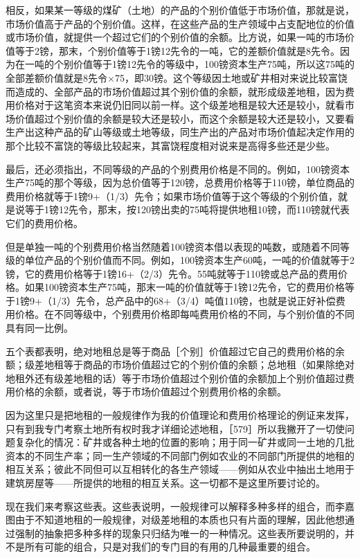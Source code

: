 相反，如果某一等级的煤矿（土地）的产品的个别价值低于市场价值，那就是说，市场价值高于产品的个别价值。这样，在这些产品的生产领域中占支配地位的价值或市场价值，就提供一个超过它们的个别价值的余额。比方说，如果一吨的市场价值等于2镑，那末，个别价值等于1镑12先令的一吨，它的差额价值就是8先令。因为在一吨的个别价值等于1镑12先令的等级中，100镑资本生产75吨，所以这75吨的全部差额价值就是8先令×75，即30镑。这个等级因土地或矿井相对来说比较富饶而造成的、全部产品的市场价值超过其个别价值的余额，就形成级差地租，因为费用价格对于这笔资本来说仍旧同以前一样。这个级差地租是较大还是较小，就看市场价值超过个别价值的余额是较大还是较小，而这个余额是较大还是较小，又要看生产出这种产品的矿山等级或土地等级，同生产出的产品对市场价值起决定作用的那个比较不富饶的等级比较起来，其富饶程度相对说来是高得多些还是少些。

最后，还必须指出，不同等级的产品的个别费用价格是不同的。例如，100镑资本生产75吨的那个等级，因为总价值等于120镑，总费用价格等于110镑，单位商品的费用价格就等于1镑9+（1/3）先令；如果市场价值等于这个等级的个别价值，就是说等于1镑12先令，那末，按120镑出卖的75吨将提供地租10镑，而110镑就代表它们的费用价格。

但是单独一吨的个别费用价格当然随着100镑资本借以表现的吨数，或随着不同等级的单位产品的个别价值而不同。例如，100镑资本生产60吨，一吨的价值就等于2镑，它的费用价格等于1镑16+（2/3）先令。55吨就等于110镑或总产品的费用价格。如果100镑资本生产75吨，那末一吨的价值就等于1镑12先令，它的费用价格等于1镑9+（1/3）先令，总产品中的68+（3/4）吨值110镑，也就是说正好补偿费用价格。在不同等级中，个别费用价格即每吨费用价格的不同，与个别价值的不同具有同一比例。

五个表都表明，绝对地租总是等于商品［个别］价值超过它自己的费用价格的余额；级差地租等于商品的市场价值超过它的个别价值的余额；总地租（如果除绝对地租外还有级差地租的话）等于市场价值超过个别价值的余额加上个别价值超过费用价格的余额，或者说，等于市场价值超过个别费用价格的余额。

因为这里只是把地租的一般规律作为我的价值理论和费用价格理论的例证来发挥，只有到我专门考察土地所有权时我才详细论述地租，［579］所以我撇开了一切使问题复杂化的情况：矿井或各种土地的位置的影响；用于同一矿井或同一土地的几批资本的不同生产率；同一生产领域的不同部门例如农业的不同部门所提供的地租的相互关系；彼此不同但可以互相转化的各生产领域——例如从农业中抽出土地用于建筑房屋等——所提供的地租的相互关系。这一切都不是这里所要讨论的。


现在我们来考察这些表。这些表说明，一般规律可以解释多种多样的组合，而李嘉图由于不知道地租的一般规律，对级差地租的本质也只有片面的理解，因此他想通过强制的抽象把多种多样的现象只归结为唯一的一种情况。这些表所要说明的，并不是所有可能的组合，只是对我们的专门目的有用的几种最重要的组合。

